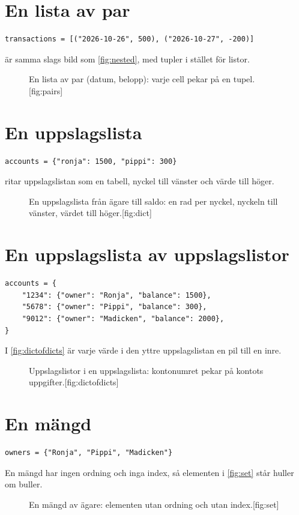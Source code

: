 \documentclass[a4paper,10pt,oneside,openright,
               oldfontcommands]{memoir}
\newcommand{\entry}[3]{%
  \begin{figure}[htbp]
    \begin{sidecaption}{#2}[fig:#1]
      #3
    \end{sidecaption}
  \end{figure}
}
\begin{document}
\section{En lista av par}

\begin{verbatim}
transactions = [("2026-10-26", 500), ("2026-10-27", -200)]
\end{verbatim}
 är samma slags bild som \cref{fig:nested}, med tupler
i stället för listor.
\entry{pairs}{En lista av par (datum, belopp): varje cell pekar på en
  tupel.}{\figPairs}

\section{En uppslagslista}

\begin{verbatim}
accounts = {"ronja": 1500, "pippi": 300}
\end{verbatim}
 ritar uppslagslistan som en tabell, nyckel till vänster
och värde till höger.
\entry{dict}{En uppslagslista från ägare till saldo: en rad per nyckel,
  nyckeln till vänster, värdet till höger.}{\figDict}

\section{En uppslagslista av uppslagslistor}

\begin{verbatim}
accounts = {
    "1234": {"owner": "Ronja", "balance": 1500},
    "5678": {"owner": "Pippi", "balance": 300},
    "9012": {"owner": "Madicken", "balance": 2000},
}
\end{verbatim}
I \cref{fig:dictofdicts} är varje värde i den yttre uppslagslistan en
pil till en inre.
\entry{dictofdicts}{Uppslagslistor i en uppslagslista: kontonumret
  pekar på kontots uppgifter.}{\figDictOfDicts}

\section{En mängd}

\begin{verbatim}
owners = {"Ronja", "Pippi", "Madicken"}
\end{verbatim}
En mängd har ingen ordning och inga index, så elementen i
\cref{fig:set} står huller om buller.
\entry{set}{En mängd av ägare: elementen utan ordning och utan
  index.}{\figSet}
\end{document}

